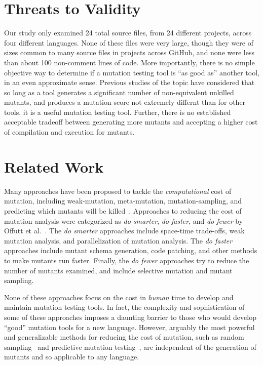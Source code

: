 \documentclass[sigconf,review, anonymous]{acmart}
\begin{document}
{\section{Threats to Validity}

Our study only examined 24 total source files, from 24 different projects, across four different
languages.  None of these files were very large, though they were of
sizes common to many source files in projects across GitHub, and none
were less than about 100 non-comment lines of code.  More importantly,
there is no simple objective way to determine if a mutation testing
tool is ``as good as'' another tool, in an even approximate sense.
Previous studies of the topic have considered that so long as a tool
generates a significant number of non-equivalent unkilled mutants, and
produces a mutation score not extremely differnt than for other tools,
it is a useful mutation testing tool.  Further, there is no
established acceptable tradeoff between generating more mutants and
accepting a higher cost of compilation and execution for mutants.

\section{Related Work}

Many approaches have been proposed to tackle the \emph{computational} cost of mutation, including weak-mutation, 
meta-mutation, mutation-sampling, and predicting which mutants will be
killed~\cite{offuttMutant1996,
  untch1993mutation,KaufmanFAKAJ2022,zhang2016pmt}.  Approaches to reducing the cost of
mutation analysis were categorized as \textit{do smarter}, \textit{do
faster}, and \textit{do fewer} by Offutt et al.~\cite{offutt2001mutation}.
The \textit{do smarter} approaches include space-time trade-offs, weak
mutation analysis, and parallelization of mutation analysis. The \textit{do
faster} approaches include mutant schema generation, code patching, and
other methods to make mutants run faster. Finally, the
\textit{do fewer} approaches try to reduce the number of mutants examined,
and include selective mutation and mutant sampling.

None of these approaches focus on the cost in \emph{human} time to
develop and maintain mutation testing tools.  In fact, the complexity
and sophistication of some of these approaches imposes a daunting
barrier to those who would develop ``good'' mutation tools for a new
language.  However, arguably the most powerful and generalizable
methods for reducing the cost of mutation, such as random sampling~\cite{GopinathSampleSize,gopinath2017mutation} and
predictive mutation testing~\cite{zhang2016pmt,kim2022predictive}, are independent of the generation of
mutants and so applicable to any language.

}
\end{document}
